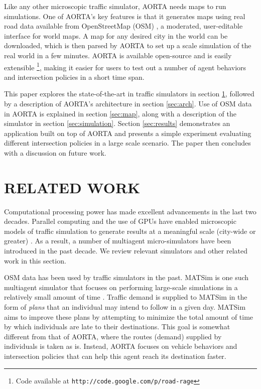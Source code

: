 \documentclass[letterpaper, 10 pt, conference]{ieeeconf}  %
\begin{document}
Like any other microscopic traffic simulator, AORTA needs maps to run
simulations. One of AORTA's key features is that it generates maps using real
road data available from OpenStreetMap (OSM) \cite{osm}, a moderated,
user-editable interface for world maps. A map for any desired city in the world
can be downloaded, which is then parsed by AORTA to set up a scale simulation
of the real world in a few minutes. AORTA is available open-source and is
easily extensible \footnote{Code available at
\texttt{http://code.google.com/p/road-rage}}, making it easier for users to
test out a number of agent behaviors and intersection policies in a short
time span.

This paper explores the state-of-the-art in traffic simulators in section
\ref{sec:related_work}, followed by a description of AORTA's architecture in
section \ref{sec:arch}.  Use of OSM data in AORTA is explained in section
\ref{sec:map}, along with a description of the simulator in section
\ref{sec:simulation}. Section \ref{sec:results} demonstrates an application
built on top of AORTA and presents a simple experiment evaluating different
intersection policies in a large scale scenario. The paper then concludes with a
discussion on future work.


\section{RELATED WORK}
\label{sec:related_work}

Computational processing power has made excellent advancements in the last two
decades. Parallel computing and the use of GPUs have enabled microscopic models
of traffic simulation to generate results at a meaningful scale (city-wide or
greater) \cite{nagel1994microscopic,shen2011agent}. As a result, a number of
multiagent micro-simulators have been introduced in the past decade. We review
relevant simulators and other related work in this section.

OSM data has been used by traffic simulators in the past. MATSim is one such
multiagent simulator that focuses on performing large-scale simulations in a
relatively small amount of time \cite{balmer2009matsim}. Traffic demand is
supplied to MATSim in the form of \textit{plans} that an individual may intend
to follow in a given day. MATSim aims to improve these plans by attempting to
minimize the total amount of time by which individuals are late to their
destinations. This goal is somewhat different from that of AORTA, where the
routes (demand) supplied by individuals is taken as is.  Instead, AORTA focuses
on vehicle behaviors and intersection policies that can help this agent reach
its destination faster.
\end{document}
